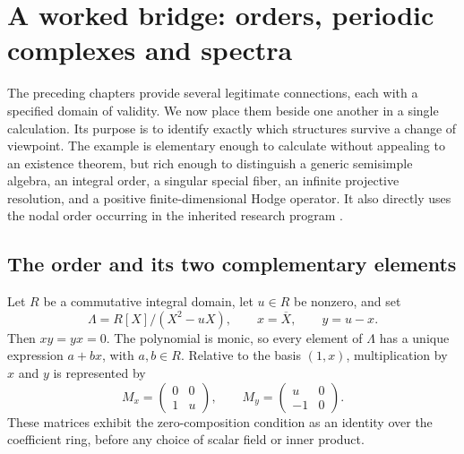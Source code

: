 \chapter{A worked bridge: orders, periodic complexes and spectra}
\label{ch:worked-bridge}

The preceding chapters provide several legitimate connections, each with a
specified domain of validity. We now place them beside one another in a single
calculation. Its purpose is to identify exactly which structures survive a
change of viewpoint. The example is elementary enough to calculate without
appealing to an existence theorem, but rich enough to distinguish a generic
semisimple algebra, an integral order, a singular special fiber, an infinite
projective resolution, and a positive finite-dimensional Hodge operator. It
also directly uses the nodal order occurring in the inherited research
program \citep{GRHRepo,SchreiberSurfaceI,SchreiberSurfaceII}.

\section{The order and its two complementary elements}

Let $R$ be a commutative integral domain, let $u\in R$ be nonzero, and set
\[
 \Lambda=R[X]/(X^2-uX),\qquad x=\overline X,\qquad y=u-x.
\]
Then $xy=yx=0$. The polynomial is monic, so every element of $\Lambda$ has a
unique expression $a+bx$, with $a,b\in R$. Relative to the basis $(1,x)$,
multiplication by $x$ and $y$ is represented by
\[
 M_x=\begin{pmatrix}0&0\\1&u\end{pmatrix},\qquad
 M_y=\begin{pmatrix}u&0\\-1&0\end{pmatrix}.
\]
These matrices exhibit the zero-composition condition as an identity over the
coefficient ring, before any choice of scalar field or inner product.

